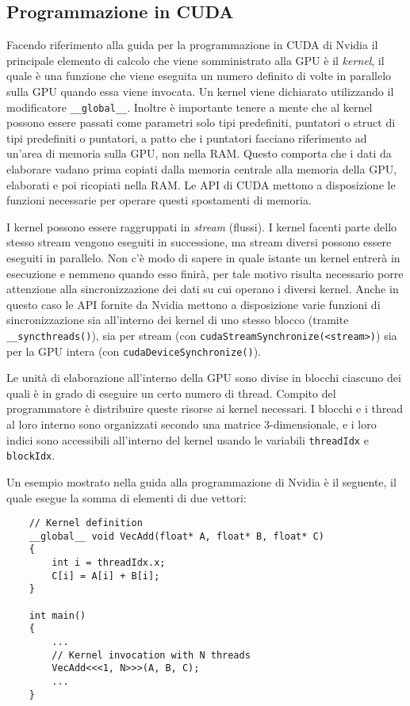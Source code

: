 \subsection{Programmazione in CUDA}
Facendo riferimento alla guida per la programmazione in CUDA di Nvidia\cite{cuda_programming_guide} il principale elemento di calcolo che viene somministrato alla GPU è il \textit{kernel}, il quale è una funzione che viene eseguita un numero definito di volte in parallelo sulla GPU quando essa viene invocata. Un kernel viene dichiarato utilizzando il modificatore \lstinline{__global__}. Inoltre è importante tenere a mente che al kernel possono essere passati come parametri solo tipi predefiniti, puntatori o struct di tipi predefiniti o puntatori, a patto che i puntatori facciano riferimento ad un'area di memoria sulla GPU, non nella RAM. Questo comporta che i dati da elaborare vadano prima copiati dalla memoria centrale alla memoria della GPU, elaborati e poi ricopiati nella RAM. Le API di CUDA mettono a disposizione le funzioni necessarie per operare questi spostamenti di memoria.

I kernel possono essere raggruppati in \textit{stream} (flussi). I kernel facenti parte dello stesso stream vengono eseguiti in successione, ma stream diversi possono essere eseguiti in parallelo. Non c'è modo di sapere in quale istante un kernel entrerà in esecuzione e nemmeno quando esso finirà, per tale motivo risulta necessario porre attenzione alla sincronizzazione dei dati su cui operano i diversi kernel. Anche in questo caso le API fornite da Nvidia mettono a disposizione varie funzioni di sincronizzazione sia all'interno dei kernel di uno stesso blocco (tramite \lstinline!__syncthreads()!), sia per stream (con \lstinline!cudaStreamSynchronize(<stream>)!) sia per la GPU intera (con \lstinline!cudaDeviceSynchronize()!).

Le unità di elaborazione all'interno della GPU sono divise in blocchi ciascuno dei quali è in grado di eseguire un certo numero di thread. Compito del programmatore è distribuire queste risorse ai kernel necessari. I blocchi e i thread al loro interno sono organizzati secondo una matrice 3-dimensionale, e i loro indici sono accessibili all'interno del kernel usando le variabili \lstinline{threadIdx} e \lstinline{blockIdx}.

Un esempio mostrato nella guida alla programmazione di Nvidia \cite{cuda_programming_guide} è il seguente, il quale esegue la somma di elementi di due vettori:

\begin{lstlisting}
    // Kernel definition
    __global__ void VecAdd(float* A, float* B, float* C)
    {
        int i = threadIdx.x;
        C[i] = A[i] + B[i];
    }

    int main()
    {
        ...
        // Kernel invocation with N threads
        VecAdd<<<1, N>>>(A, B, C);
        ...
    }
\end{lstlisting}

